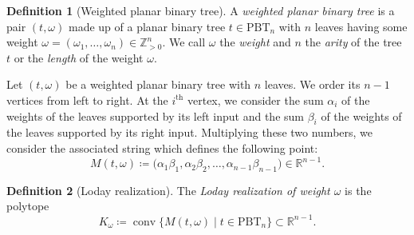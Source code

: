 \documentclass[10pt,a4paper]{amsart}
\numberwithin{equation}{section}\providecommand{\No}{}
\theoremstyle{plain}
\theoremstyle{definition}
\newtheorem{definition}{Definition}
\newcommand{\RR}{\mathbb{R}}
\newcommand{\ZP}{\mathbb{Z}_{>0}}
\newcommand{\K}{{K}}
\newcommand{\Tam}[1]{\mathrm{PBT}_{#1}}
\DeclareMathOperator{\conv}{conv}
\begin{document}
\begin{definition}[Weighted planar binary tree]
A \emph{weighted planar binary tree} is a pair $(t, \omega)$ made up of a planar binary tree $t\in \Tam{n}$ with $n$ leaves having some weight $\omega= (\omega_1, \ldots, \omega_n) \in \ZP^n$. We call
$\omega$ the \emph{weight} and
$n$ the \emph{arity} of the tree $t$ or the \emph{length} of the weight $\omega$.
\end{definition}

Let $(t, \omega)$ be a weighted planar binary tree with $n$ leaves. We order its $n-1$ vertices from left to right. At the $i^\text{th}$ vertex, we consider the sum $\alpha_i$ of the weights of the leaves supported by its left input and
the sum $\beta_i$ of the weights of the leaves supported by its right input.
Multiplying these two numbers, we consider the associated string which defines the following point:\vspace*{-3pt}
\[M(t, \omega) \coloneqq \big(\alpha_1\beta_1, \alpha_2\beta_2, \ldots, \alpha_{n-1}\beta_{n-1}\big)\in \RR^{n-1}. \]

\begin{definition}[Loday realization]
The \emph{Loday realization of weight $\omega$} is the polytope\vspace*{-3pt}
\[\K_\omega \coloneqq \conv \big\{M(t, \omega)\mid t\in \Tam{n} \big\}\subset \RR^{n-1}.\]
\end{definition}
\end{document}
